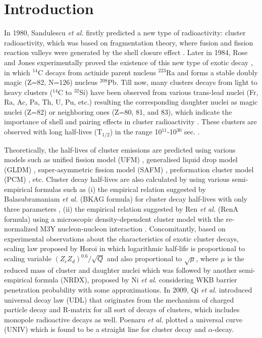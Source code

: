 \documentclass[preprint,10pt]{elsarticle}
\begin{document}
\section{Introduction}
\label{intro}
In 1980, Sandulescu \textit{et al.} \cite{sandulescu1980} firstly predicted a new type of radioactivity: cluster radioactivity, which was based on fragmentation theory, where fusion and fission reaction valleys were generated by the shell closure effect \cite{Gupta1994}. Later in 1984, Rose and Jones experimentally proved the existence of this new type of exotic decay \cite{rose1984}, in which $^{14}$C decays from actinide parent nucleus $^{223}$Ra and forms a stable doubly magic (Z=82, N=126) nucleus $^{208}$Pb. Till now, many clusters decays from light to heavy clusters ($^{14}$C to $^{32}$Si) have been observed from various trans-lead nuclei (Fr, Ra, Ac, Pa, Th, U, Pu, etc.) resulting the corresponding daughter nuclei as magic nuclei (Z=82) or neighboring ones (Z=80, 81, and 83), which indicate the importance of shell and pairing effects in cluster radioactivity \cite{Kumar2003,Kumar2009,Gupta2003}. These clusters are observed with long half-lives (T$_{1/2}$) in the range 10$^{11}$-10$^{30}$ sec. \cite{Bonetti2007}.\par
Theoretically, the half-lives of cluster emissions are predicted using various models such as unified fission model (UFM) \cite{Shi1989}, generalised liquid drop model (GLDM) \cite{Royer2001}, super-asymmetric fission model (SAFM) \cite{Poenaru1985}, preformation cluster model (PCM) \cite{Poenaru2002}, etc. Cluster decay half-lives are also calculated by using various semi-empirical formulas such as (i) the empirical relation suggested by Balasubramaniam \textit{et al.} (BKAG formula) for cluster decay half-lives with only three parameters \cite{balasubramaniam2004}, (ii) the empirical relation suggested by Ren \textit{et al.} (RenA formula) using a microscopic density-dependent cluster model with the re-normalized M3Y nucleon-nucleon interaction \cite{rena2004}. Concomitantly, based on experimental observations about the characteristics of exotic cluster decays, scaling law proposed by Horoi \cite{horoi2004} in which logarithmic half-life is proportional to scaling variable $(Z_{c}Z_{d})^{0.6}/\sqrt{Q}$ and also proportional to $\sqrt{\mu}$, where $\mu$ is the reduced mass of cluster and daughter nuclei which was followed by another semi-empirical formula (NRDX), proposed by Ni \textit{et al.} \cite{nrdx2008} considering WKB barrier penetration probability with some approximations. In 2009, Qi \textit{et al.} introduced universal decay law (UDL) \cite{udl2009} that originates from the mechanism of charged particle decay and R-matrix for all sort of decays of clusters, which includes monopole radioactive decays as well. Poenaru \textit{et al.} \cite{univ2011} plotted a universal curve (UNIV) which is found to be a straight line for cluster decay and $\alpha$-decay.\par
\end{document}
